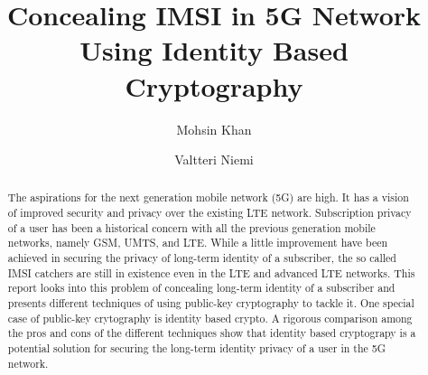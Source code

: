 \documentclass[lnicst,sechang,a4paper]{svmultln}
\begin{document}
\mainmatter  %

\title{Concealing IMSI in 5G Network Using Identity Based Cryptography}


%
%
\author{Mohsin Khan%
\and Valtteri Niemi}  %


%
%

\maketitle


\begin{abstract}
The aspirations for the next generation mobile network (5G) are high. It has a vision of improved security and privacy over the existing LTE network. Subscription privacy of a user has been a historical concern with all the previous generation mobile networks, namely GSM, UMTS, and LTE. While a little improvement have been achieved in securing the privacy of long-term identity of a subscriber, the so called IMSI catchers are still in existence even in the LTE and advanced LTE networks. This report looks into this problem of concealing long-term identity of a subscriber and presents different techniques of using public-key cryptography to tackle it. One special case of public-key crytography is identity based crypto. A rigorous comparison among the pros and cons of the different techniques show that identity based cryptograpy is a potential solution for securing the long-term identity privacy of a user in the 5G network.
\end{abstract}
\end{document}
